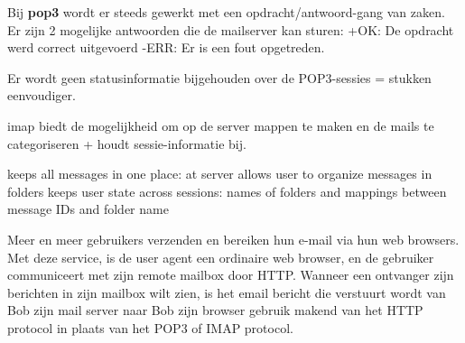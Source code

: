 \noindent Bij \textbf{\acrshort{pop3}} wordt er steeds gewerkt met een opdracht/antwoord-gang van zaken. Er zijn 2 mogelijke antwoorden die de mailserver kan sturen:
\bi
\itf +OK: De opdracht werd correct uitgevoerd
\itf -ERR: Er is een fout opgetreden.
\ei

\noindent Er wordt geen statusinformatie bijgehouden over de POP3-sessies = stukken eenvoudiger.


\acrshort{imap} biedt de mogelijkheid om op de server mappen te maken en de mails te categoriseren + houdt sessie-informatie bij.

\bi
\itf keeps all messages in one place: at server
\itf allows user to organize messages in folders
\itf keeps user state across sessions:
\bi
\itf names of folders and mappings between message IDs and folder name
\ei
\ei


Meer en meer gebruikers verzenden en bereiken hun e-mail via hun web browsers. Met deze service, is de user agent een ordinaire web browser, en de gebruiker communiceert met zijn remote mailbox door HTTP. Wanneer een ontvanger zijn berichten in zijn mailbox wilt zien, is het email bericht die verstuurt wordt van Bob zijn mail server naar Bob zijn browser gebruik makend van het HTTP protocol in plaats van het POP3 of IMAP protocol.
